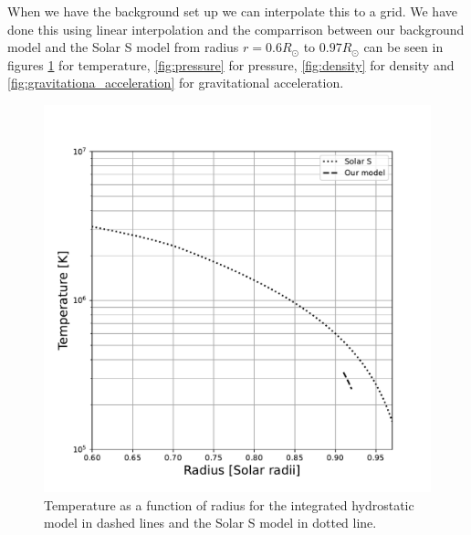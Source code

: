 When we have the background set up we can interpolate this to a grid. We have done this using linear interpolation and the comparrison between our background model and the Solar S model from radius $r=0.6R_{\odot}$ to $0.97R_{\odot}$ can be seen in figures \ref{fig:temperature} for temperature, \ref{fig:pressure} for pressure, \ref{fig:density} for density and \ref{fig:gravitationa_acceleration} for gravitational acceleration.

\begin{figure}[htbp]
    \centering
    \includegraphics[width=0.8\linewidth]{./solar_vs_model_plots/Temperature.pdf} %
    \caption{Temperature as a function of radius for the integrated hydrostatic model in dashed lines and the Solar S model in dotted line.}
    \label{fig:temperature} %
\end{figure}

